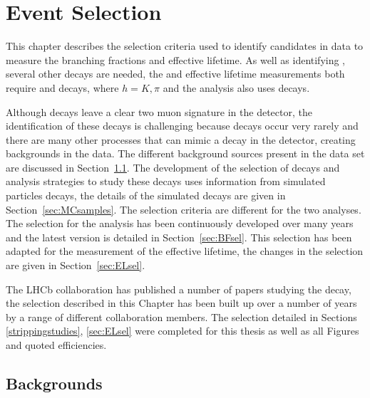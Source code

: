 \chapter{Event Selection}
\label{selection_chapter}

This chapter describes the selection criteria used to identify \bmumu candidates in data to measure the \bmumu branching fractions and \bsmumu effective lifetime. As well as identifying \bmumu, several other decays are needed, %
the \BF and effective lifetime measurements both require \bsjpsiphi and \bhh decays, where $h = K, \pi$ and the \BF analysis also uses \bujpsik decays.  

Although \bsmumu decays leave a clear two muon signature in the detector, the identification of these decays is challenging because \bmumu decays occur very rarely and there are many other processes that can mimic a \bmumu decay in the detector, creating backgrounds in the data. The different background sources present in the data set are discussed in Section~\ref{sec:backgroundoutline}. The development of the selection of \bmumu decays and analysis strategies to study these decays uses information from 
simulated particles decays, the details of the simulated decays are given in Section~\ref{sec:MCsamples}. 
The selection criteria are different for the two analyses. The selection for the \bmumu \BF analysis has been continuously developed over many years and the latest version is detailed in Section~\ref{sec:BFsel}. This selection has been adapted for the measurement of the \bsmumu effective lifetime, the changes in the selection are given in Section~\ref{sec:ELsel}.


The LHCb collaboration has published a number of papers studying the \bsmumu decay, the selection described in this Chapter has been built up over a number of years by a range of different collaboration members. The selection detailed in Sections \ref{strippingstudies}, \ref{sec:ELsel} were completed for this thesis as well as all Figures and quoted efficiencies.

\section{Backgrounds}
\label{sec:backgroundoutline}

